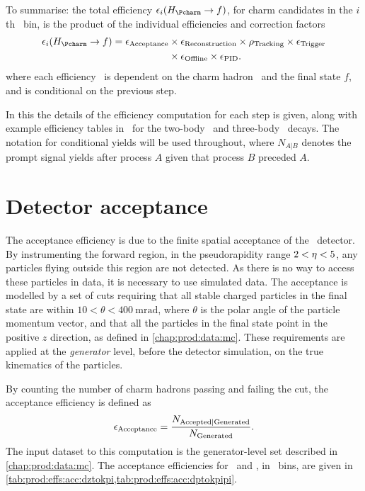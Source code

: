 To summarise: the total efficiency $\eff_{i}(\decay{\PHc}{f})$, for charm candidates in the $i$th \pTy\ bin, is 
the product of the individual efficiencies and correction factors
\begin{align}
  \eff_{i}(\decay{\PHc}{f}) = \effacc &\times \effreco \times \efftracking \times \efftrig \nonumber\\
                                      &\times \effoffline \times \effpid.
  \label{eqn:prod:effs:total_eff}
\end{align}
where each efficiency \eff\ is dependent on the charm hadron \PHc\ and the 
final state $f$, and is conditional on the previous step.

In this  the details of the efficiency computation for each step is 
given, along with example efficiency tables in \pTy\ for the two-body \DzToKpi\ 
and three-body \DpToKpipi\ decays.
The notation for conditional yields will be used throughout, where $N_{A|B}$ 
denotes the prompt signal yields after process $A$ given that process $B$ 
preceded $A$.

\section{Detector acceptance}
\label{chap:prod:effs:acc}

The acceptance efficiency is due to the finite spatial acceptance of the \lhcb\ 
detector.
By instrumenting the forward region, in the pseudorapidity range $2 < \eta < 
5$, any particles flying outside this region are not detected.
As there is no way to access these particles in data, it is necessary to use 
simulated data.
The acceptance is modelled by a set of cuts requiring that all stable charged 
particles in the final state are within $10 < \theta < 
\SI{400}{\milli\radian}$, where $\theta$ is the polar angle of the particle 
momentum vector, and that all the particles in the final state point in the 
positive $z$ direction, as defined in \cref{chap:prod:data:mc}.
These requirements are applied at the \emph{generator} level, before the 
detector simulation, on the true kinematics of the particles.

By counting the number of charm hadrons passing and failing the cut, the 
acceptance efficiency is defined as
\begin{equation}
  \effacc = \frac{%
    N_{\text{Accepted}|\text{Generated}}
  }
  {%
    N_{\text{\text{Generated}}}
  }.
  \label{eqn:prod:effs:acc}
\end{equation}
The input dataset to this computation is the generator-level set described in 
\cref{chap:prod:data:mc}.
The acceptance efficiencies for \DzToKpi\ and \DpToKpipi, in \pTy\ bins, are 
given in \cref{tab:prod:effs:acc:dztokpi,tab:prod:effs:acc:dptokpipi}.

